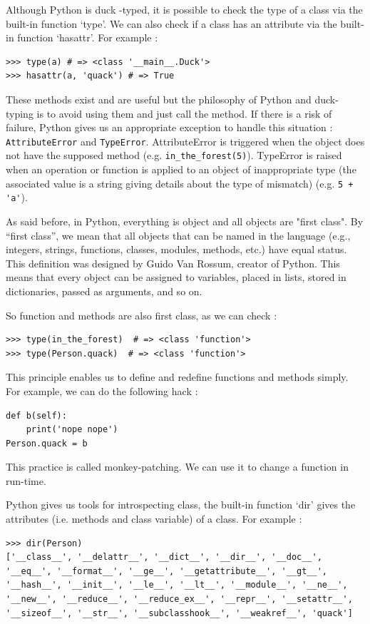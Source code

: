 \documentclass[a4paper,10pt]{article}
\begin{document}
Although Python is duck -typed, it is possible to check the type of a class via the built-in function ‘type’. We can also check if a class has an attribute via the built-in function ‘hasattr’. For example :

\begin{lstlisting}
>>> type(a) # => <class '__main__.Duck'>
>>> hasattr(a, 'quack') # => True
\end{lstlisting}

These methods exist and are useful but the philosophy of Python and duck-typing is to avoid using them and just call the method. If there is a risk of failure, Python gives us an appropriate exception to handle this situation : \lstinline|AttributeError| and \lstinline|TypeError|. AttributeError is triggered when the object does not have the supposed method (e.g. \lstinline|in_the_forest(5)|). TypeError is raised when an operation or function is applied to an object of inappropriate type (the associated value is a string giving details about the type of mismatch) (e.g. \lstinline|5 + 'a'|).

As said before, in Python, everything is object and all objects are "first class". By “first class”, we mean that all objects that can be named in the language (e.g., integers, strings, functions, classes, modules, methods, etc.) have equal status. This definition was designed by Guido Van Rossum, creator of Python. This means that every object can be assigned to variables, placed in lists, stored in dictionaries, passed as arguments, and so on. 

So function and methods are also first class, as we can check :
\begin{lstlisting}
>>> type(in_the_forest)  # => <class 'function'>
>>> type(Person.quack)  # => <class 'function'>
\end{lstlisting}

This principle enables us to define and redefine functions and methods simply. For example, we can do the following hack :

\begin{lstlisting}
def b(self):
    print('nope nope')
Person.quack = b
\end{lstlisting}


This practice is called monkey-patching. We can use it to change a function in run-time.

Python gives us tools for introspecting class, the built-in function ‘dir’ gives the attributes (i.e. methods and class variable) of a class. For example :
\begin{lstlisting}
>>> dir(Person)
['__class__', '__delattr__', '__dict__', '__dir__', '__doc__', '__eq__', '__format__', '__ge__', '__getattribute__', '__gt__', '__hash__', '__init__', '__le__', '__lt__', '__module__', '__ne__', '__new__', '__reduce__', '__reduce_ex__', '__repr__', '__setattr__', '__sizeof__', '__str__', '__subclasshook__', '__weakref__', 'quack']
\end{lstlisting}
\end{document}
